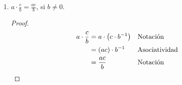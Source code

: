 \documentclass[11pt]{article}
\begin{document}
\begin{enumerate}[label=\alph*)]
 \item $a \cdot \frac{c}{b} = \frac{ac}{b}$, si $b \neq 0$.
 \begin{proof} 
 \begin{align*}
  a\cdot \frac{c}{b} &= a\cdot \bigl(c\cdot b^{-1}\bigr) && \text{Notación}\\
  &= (ac) \cdot b^{-1} && \text{Asociatividad}\\
  &= \frac{ac}{b} && \text{Notación} \qedhere
 \end{align*}
 \end{proof}


\end{enumerate}
\end{document}
